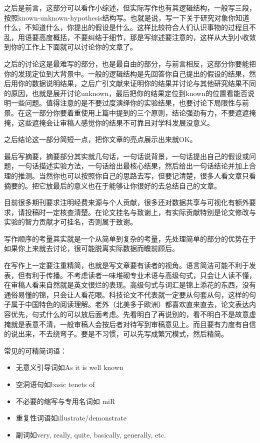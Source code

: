 \documentclass[]{tufte-book}
\providecommand{\tightlist}{%
  \setlength{\itemsep}{0pt}\setlength{\parskip}{0pt}}
\begin{document}
之后是前言，这部分可以看作小综述，但实际写作也有其逻辑结构，一般写三段，按照known-unknown-hypothesis结构写。也就是说，写一下关于研究对象你知道什么，不知道什么，你提出的假设是什么。这样比较符合人们认识事物的过程且不乱，用语要高度概括，不要纠结于细节，那是写综述要注意的，这样从大到小收敛到你的工作上下面就可以讨论你的文章了。

之后的讨论这是最难写的部分，也是最自由的部分，与前言相反，这部分你要能把你的发现定位到大背景中。一般的逻辑结构是先回答你自己提出的假设的结果，然后用你的数据说明结果，之后广引文献来证明你的结果并讨论与其他研究结果不同的原因，也就是展开讨论unknown，最后把你的结果定位到known的位置看能否说明一些问题。值得注意的是不要过度演绎你的实验结果，也要讨论下局限性与前景。在这一部分你要着重使用上篇中提到的三个原则，结论强劲有力，不要遮遮掩掩，这些遮掩会让审稿人感觉你的结果不可靠且对学科发展没意义。

之后结论这一部分简短一点，把你文章的亮点展示出来就OK。

最后写摘要，摘要部分其实就几句话，一句话说背景，一句话提出自己的假设或问题，一句话描述实验方法，一句话给出最核心结果，然后给出一句话结论并加上合理的推测。当然你也可以按照你自己的思路去写，但要记清楚，很多人看文章只看摘要的。把它放最后的意义也在于能够让你很好的去总结自己的文章。

目前很多期刊要求注明经费来源与个人贡献，很多还对数据共享与可视化有额外要求，请投稿时一定核查清楚。在论文挂名与致谢上，有实际贡献特别是论文修改与实验的智力贡献才可挂名，否则属于致谢。

写作顺序的考量其实就是一个从简单到复杂的考量，先处理简单的部分的优势在于如果你上来就去讨论，很可能脱离实际数据而瞻前顾后。

在写作上一定要注重精简，也就是写文章要有读者的视角。语言简洁可能不利于发表，但有利于传播。不考虑读者一味堆砌专业术语与高级句式，只会让人读不懂，在审稿人看来自然就是英文很烂的表现。高级句式与词汇是锦上添花的东西，没有通俗易懂的锦，只会让人看花眼。科技论文不代表就一定要从句套从句，这样的句子属于中国特色的阅读理解。老外（北美多于欧洲）都喜欢直来直去，论文表达内容优先，句式什么的可以放后面考虑。先看明白了再说别的，看不明白不是故意虚掩就是表意不清，一般审稿人会按后者对待写到审稿意见上。而且要有力度有自信的说出来，不去绕弯子。要是不习惯，可以先写成繁冗模式，然后精简。

常见的可精简词语：

\begin{itemize}
\tightlist
\item
  无意义引导词如As it is well known
\item
  空洞语句如basic tenets of
\item
  不必要的缩写与专用名词如 miR
\item
  重复性词语如illustrate/demonstrate
\item
  副词如very, really, quite, basically, generally, etc.
\end{itemize}
\end{document}
